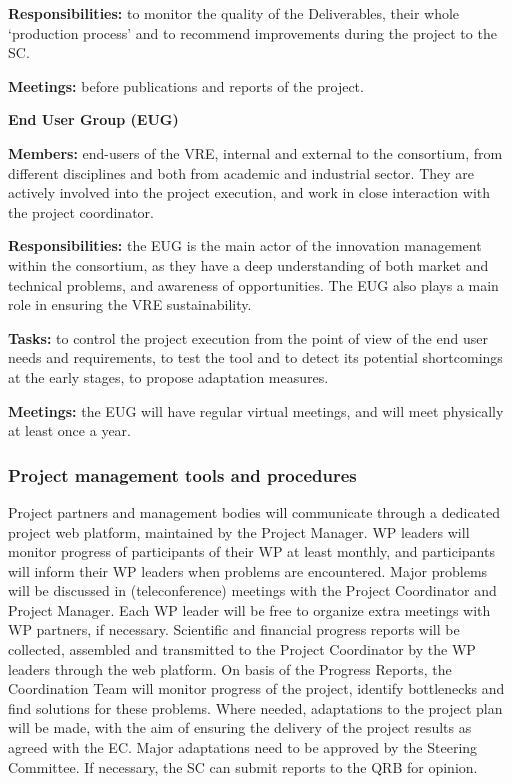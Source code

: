 \textbf{Responsibilities:}
to monitor the quality of the Deliverables, their whole ‘production
process’ and to recommend improvements during the project to the SC.

\textbf{Meetings:} before publications and reports of the
project.

\smallbreak\noindent\textbf{End User Group (EUG)}\nobreak\par

\textbf{Members:} end-users of the VRE, internal and external to
the consortium, from different disciplines and both from academic and
industrial sector. They are actively involved into the project
execution, and work in close interaction with the project coordinator.

\textbf{Responsibilities:} the EUG is the main actor of the innovation
management within the consortium, as they have a deep understanding of
both market and technical problems, and awareness of
opportunities. The EUG also plays a main role in ensuring the VRE
sustainability.  

\textbf{Tasks:} to control the project execution from the
point of view of the end user needs and requirements, to test the tool
and to detect its potential shortcomings at the early stages, to
propose adaptation measures.  

\textbf{Meetings:} the EUG will have regular
virtual meetings, and will meet physically at least once a year.


\subsubsection{Project management tools and procedures}

Project partners and management bodies will communicate through
a dedicated project web platform, maintained by the Project
Manager. WP leaders will monitor progress of
participants of their WP at least monthly, and participants will inform their WP
leaders when problems are encountered. Major problems will be
discussed in (teleconference) meetings with the Project Coordinator
and Project Manager. Each WP leader will be free to organize
extra meetings with WP partners, if necessary. Scientific and
financial progress reports will be collected, assembled and
transmitted to the Project Coordinator by the WP leaders through the
web platform. On basis of the Progress Reports, the Coordination Team
will monitor progress of the project, identify bottlenecks and find
solutions for these problems. Where needed, adaptations to the project
plan will be made, with the aim of ensuring the delivery of the project
results as agreed with the EC. Major adaptations need to be approved
by the Steering Committee.  If necessary, the SC can submit reports to
the QRB for opinion.

